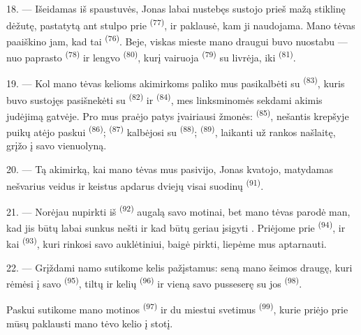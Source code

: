 \VUsaut{3.0mm}

18. --- Išeidamas iš spaustuvės, Jonas labai nustebęs sustojo prieš mažą stiklinę
dėžutę, pastatytą ant stulpo prie 
\textsuperscript{(77)}, ir paklausė, kam ji naudojama. Mano tėvas paaiškino jam, kad
tai  \textsuperscript{(76)}. Beje, viskas mieste mano draugui
buvo nuostabu --- nuo paprasto  \textsuperscript{(78)} ir
lengvo  \textsuperscript{(80)}, kurį vairuoja
 \textsuperscript{(79)} su livrėja, iki 
\textsuperscript{(81)}.

19. --- Kol mano tėvas kelioms akimirkoms paliko mus pasikalbėti su  \textsuperscript{(83)}, kuris buvo sustojęs pasišnekėti su 
\textsuperscript{(82)} ir  \textsuperscript{(84)}, mes linksminomės
sekdami akimis judėjimą gatvėje. Pro mus praėjo patys įvairiausi žmonės:
 \textsuperscript{(85)}, nešantis krepšyje puikų
 atėjo paskui  \textsuperscript{(86)};
 \textsuperscript{(87)} kalbėjosi su 
\textsuperscript{(88)};  \textsuperscript{(89)}, laikanti už rankos
našlaitę, grįžo į savo vienuolyną.

\VUsaut{3.0mm}

20. --- Tą akimirką, kai mano tėvas mus pasivijo, Jonas kvatojo, matydamas nešvarius
veidus ir keistus apdarus dviejų visai suodinų 
\textsuperscript{(91)}.

21. --- Norėjau nupirkti iš  \textsuperscript{(92)} augalą savo
motinai, bet mano tėvas parodė man, kad jis būtų labai sunkus nešti ir kad būtų
geriau įsigyti . Priėjome prie 
\textsuperscript{(94)}, ir kai  \textsuperscript{(93)}, kuri rinkosi savo
auklėtiniui, baigė pirkti, liepėme mus aptarnauti.

22. --- Grįždami namo sutikome kelis pažįstamus: seną mano šeimos draugę, kuri rėmėsi
į savo  \textsuperscript{(95)}, tiltų ir kelių 
\textsuperscript{(96)} ir vieną savo pusseserę su jos 
\textsuperscript{(98)}.

Paskui sutikome mano motinos  \textsuperscript{(97)} ir du
miestui svetimus  \textsuperscript{(99)}, kurie priėjo prie mūsų
paklausti mano tėvo kelio į stotį.

\VUsaut{6.0mm}
\VUfilet{22mm}
